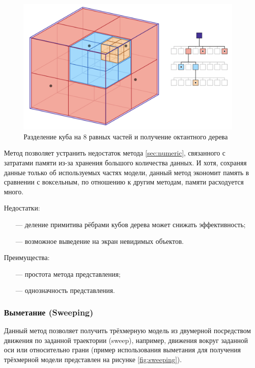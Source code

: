 \begin{figure}[h]
	\centering
	\captionsetup{justification=centering}
	\includegraphics[width=\textwidth]{img/octTree.png}
	\caption{Разделение куба на 8 равных частей и получение 
		октантного дерева}
	\label{fig:octTree}
\end{figure}

Метод позволяет устранить недостаток метода \ref{sec:numeric}, 
связанного с затратами памяти из-за хранения большого количества данных.
И хотя, сохраняя данные только об используемых частях модели, данный метод экономит память в сравнении с воксельным, по отношению к другим методам, 
памяти расходуется много.

Недостатки:
\begin{itemize}[leftmargin=1.6\parindent]
	\item[---] деление примитива рёбрами кубов дерева может снижать 
	эффективность;
	\item[---] возможное выведение на экран невидимых объектов.
\end{itemize}

Преимущества:
\begin{itemize}[leftmargin=1.6\parindent]
	\item[---] простота метода представления;
	\item[---] однозначность представления.
\end{itemize}


\subsubsection{Выметание (Sweeping)}

Данный метод \cite{sweeping} позволяет получить трёхмерную модель из двумерной 
посредством движения по заданной траектории (sweep), например, движения 
вокруг заданной оси или относительно грани (пример использования выметания для получения трёхмерной модели представлен на рисунке \ref{fig:sweeping}).

